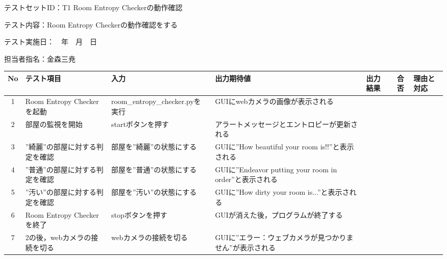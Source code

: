 テストセットID：T1 Room Entropy Checkerの動作確認

テスト内容：Room Entropy Checkerの動作確認をする

テスト実施日：　年　月　日

担当者指名：金森三尭


\begin{table}[H]
    \centering
    \begin{tabular}{|c|p{11em}|p{11em}|p{7em}|p{6em}|c|p{5em}|} \hline
        No & テスト項目 & 入力 & 出力期待値 & 出力結果 & 合否 & 理由と対応 \\ \hline
        1 & Room Entropy Checkerを起動 & room\_entropy\_checker.pyを実行 & GUIにwebカメラの画像が表示される &  &  & \\ \hline
        2 & 部屋の監視を開始 & startボタンを押す & アラートメッセージとエントロピーが更新される &  &  & \\ \hline
        3 & ”綺麗”の部屋に対する判定を確認 & 部屋を”綺麗”の状態にする & GUIに”How beautiful your room is!!”と表示される &  &  & \\ \hline
        4 & ”普通”の部屋に対する判定を確認 & 部屋を”普通”の状態にする & GUIに”Endeavor putting your room in order”と表示される &  &  & \\ \hline
        5 & ”汚い”の部屋に対する判定を確認 & 部屋を”汚い”の状態にする & GUIに”How dirty your room is...”と表示される &  &  & \\ \hline
        6 & Room Entropy Checkerを終了 & stopボタンを押す & GUIが消えた後，プログラムが終了する &  &  & \\ \hline
        7 & 2の後，webカメラの接続を切る & webカメラの接続を切る & GUIに”エラー：ウェブカメラが見つかりません”が表示される &  &  & \\ \hline
    \end{tabular}
    \label{tab:test_set1}
\end{table}